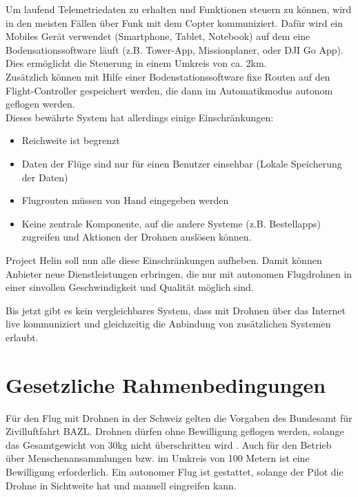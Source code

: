 Um laufend Telemetriedaten zu erhalten und Funktionen steuern zu können, wird in den meisten Fällen über Funk mit dem Copter kommuniziert. Dafür wird ein Mobiles Gerät verwendet (Smartphone, Tablet, Notebook) auf dem eine Bodensationssoftware läuft (z.B. Tower-App, Missionplaner, oder DJI Go App). Dies ermöglicht die Steuerung in einem Umkreis von ca. 2km.  \\

Zusätzlich können mit Hilfe einer Bodenstationssoftware fixe Routen auf den Flight-Controller gespeichert werden, die dann im Automatikmodus autonom geflogen werden.\\

Dieses bewährte System hat allerdings einige Einschränkungen: 

\begin{itemize}
	\item{Reichweite ist begrenzt}
	\item{Daten der Flüge sind nur für einen Benutzer einsehbar (Lokale Speicherung der Daten)}
	\item{Flugrouten müssen von Hand eingegeben werden}
	\item{Keine zentrale Komponente, auf die andere Systeme (z.B. Bestellapps) zugreifen und Aktionen der Drohnen auslösen können.}
\end{itemize}

Project Helin soll nun alle diese Einschränkungen aufheben. Damit können Anbieter neue Dienstleistungen erbringen, die nur mit autonomen Flugdrohnen in einer sinvollen Geschwindigkeit und Qualität möglich sind.

Bis jetzt gibt es kein vergleichbares System, dass mit Drohnen über das Internet live kommuniziert und gleichzeitig die Anbindung von zusätzlichen Systemen erlaubt.

\section{Gesetzliche Rahmenbedingungen}

Für den Flug mit Drohnen in der Schweiz gelten die Vorgaben des Bundesamt für Zivilluftfahrt BAZL.
Drohnen dürfen ohne Bewilligung geflogen werden, solange das Gesamtgewicht von 30kg nicht überschritten wird \cite{drohne-bazl}.
Auch für den Betrieb über Menschenansammlungen bzw. im Umkreis von 100 Metern ist eine Bewilligung erforderlich.
Ein autonomer Flug ist gestattet, solange der Pilot die Drohne in Sichtweite hat und manuell eingreifen kann.
\\

